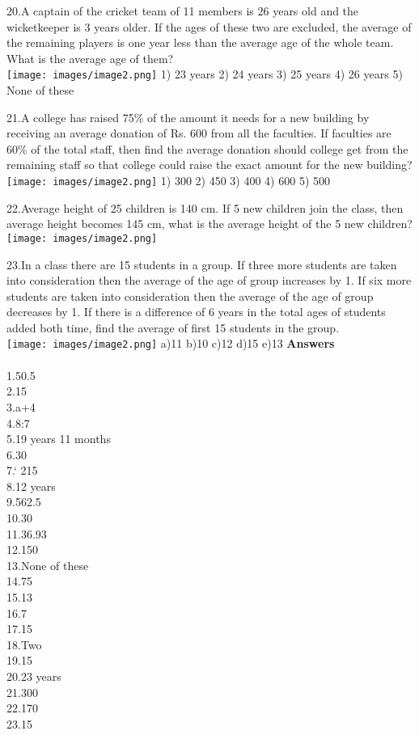 \documentclass[
]{article}
\begin{document}
20.A captain of the cricket team of 11 members is 26 years old and the wicketkeeper is 3 years older. If the ages of these two are excluded, the average of the remaining players is one year less than the average age of the whole team. What is the average age of them?   \\
\texttt{[image: images/image2.png]}   1) 23 years 	2) 24 years 	3) 25 years 	4) 26 years 	5) None of these

21.A college has raised 75\% of the amount it needs for a new building by receiving an average donation of Rs. 600 from all the faculties. If faculties are 60\% of the total staff, then find the average donation should college get from the remaining staff so that college could raise the exact amount for the new building?   \\
\texttt{[image: images/image2.png]}   1) 300 	2) 450 	3) 400 	4) 600 	5) 500

22.Average height of 25 children is 140 cm. If 5 new children join the class, then average height becomes 145 cm, what is the average height of the 5 new children?  \\
\texttt{[image: images/image2.png]}   

23.In a class there are 15 students in a group. If three more students are taken into consideration then the average of the age of group increases by 1. If six more students are taken into consideration then the average of the age of group decreases by 1. If there is a difference of 6 years in the total ages of students added both time, find the average of first 15 students in the group.   \\
\texttt{[image: images/image2.png]}   a)11 	b)10 	c)12 	d)15 	e)13
\newpage
{\large \textbf{Answers \\}}
\\ 1.50.5 \\
2.15 \\
3.a+4 \\
4.8:7 \\
5.19 years 11 months \\
6.30 \\
7.` 215 \\
8.12 years \\
9.562.5 \\
10.30 \\
11.36.93 \\
12.150 \\
13.None of these \\
14.75 \\
15.13 \\
16.7 \\
17.15 \\
18.Two \\
19.15 \\
20.23 years \\
21.300 \\
22.170 \\
23.15 \\
\end{document}
